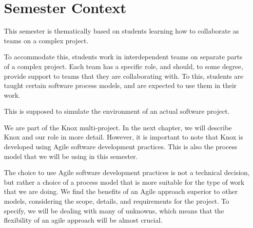 \section{Semester Context}
This semester is thematically based on students learning how to collaborate as teams on a complex project.

To accommodate this, students work in interdependent teams on separate parts of a complex project. 
Each team has a specific role, and should, to some degree, provide support to teams that they are collaborating with.
To this, students are taught certain software process models, and are expected to use them in their work.

This is supposed to simulate the environment of an actual software project.

We are part of the Knox multi-project. In the next chapter, we will describe Knox and our role in more detail.
However, it is important to note that Knox is developed using Agile software development practices.
This is also the process model that we will be using in this semester.

The choice to use Agile software development practices is not a technical decision, but rather a choice of a process model that is more suitable for the type of work that we are doing.
We find the benefits of an Agile approach superior to other models, considering the scope, details, and requirements for the project.
To specify, we will be dealing with many of unknowns, which means that the flexibility of an agile approach will be almost crucial.

% 
